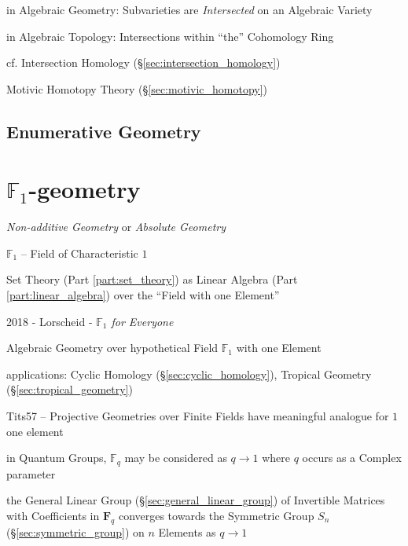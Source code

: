 in Algebraic Geometry: Subvarieties are \emph{Intersected} on an
Algebraic Variety

in Algebraic Topology: Intersections within ``the'' Cohomology Ring

\fist cf. Intersection Homology (\S\ref{sec:intersection_homology})

\fist Motivic Homotopy Theory (\S\ref{sec:motivic_homotopy})



\subsection{Enumerative Geometry}\label{sec:enumerative_geometry}



\section{$\mathbb{F}_1$-geometry}\label{sec:f1_geometry}

\emph{Non-additive Geometry} or \emph{Absolute Geometry}

$\mathbb{F}_1$ -- Field of Characteristic $1$

Set Theory (Part \ref{part:set_theory}) as Linear Algebra (Part
\ref{part:linear_algebra}) over the ``Field with one Element''

2018 - Lorscheid - \emph{$\mathbb{F}_1$ for Everyone}

Algebraic Geometry over hypothetical Field $\mathbb{F}_1$ with one Element

applications: Cyclic Homology (\S\ref{sec:cyclic_homology}), Tropical Geometry
(\S\ref{sec:tropical_geometry})

Tits57 -- Projective Geometries over Finite Fields have meaningful analogue for
$1$ one element

in Quantum Groups, $\mathbb{F}_q$ may be considered as $q \rightarrow 1$ where
$q$ occurs as a Complex parameter

the General Linear Group (\S\ref{sec:general_linear_group}) of Invertible
Matrices with Coefficients in $\mathbf{F}_q$ converges towards the Symmetric
Group $S_n$ (\S\ref{sec:symmetric_group}) on $n$ Elements as $q \rightarrow 1$

